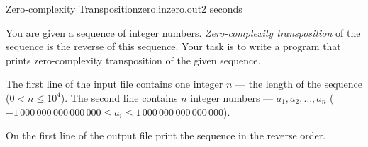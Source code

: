 \begin{problem}{Zero-complexity Transposition}{zero.in}{zero.out}{2 seconds}

You are given a sequence of integer numbers. \emph{Zero-complexity transposition}
of the sequence is the reverse of this sequence. Your task is to write a program 
that prints zero-complexity transposition of the given sequence.

\InputFile

The first line of the input file contains one integer $n$ --- the length of the 
sequence ($0 < n \le 10^4$). The second line contains $n$ integer numbers --- 
$a_1, a_2, \dots, a_n$ ($-1\,000\,000\,000\,000\,000 \le a_i \le 1\,000\,000\,000\,000\,000$).

\OutputFile

On the first line of the output file print the sequence in the reverse order.

\Example

\begin{example}
%
%
\end{example}

\end{problem}
